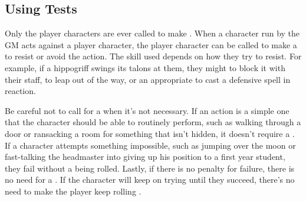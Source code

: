 
\subsection{Using Tests}

Only the player characters are ever called to make {\tests}.
When a character run by the GM acts against a player character, the player character can be called to make a {\test} to resist or avoid the action.
The skill used depends on how they try to resist.
For example, if a hippogriff swings its talons at them, they might {\test}  to block it with their staff, {\test}  to leap out of the way, or {\test} an appropriate {\magicskill} to cast a defensive spell in reaction.

Be careful not to call for a {\test} when it's not necessary.
If an action is a simple one that the character should be able to routinely perform, such as walking through a door or ransacking a room for something that isn't hidden, it doesn't require a {\test}.
If a character attempts something impossible, such as jumping over the moon or fast-talking the headmaster into giving up his position to a first year student, they fail without a {\test} being rolled.
Lastly, if there is no penalty for failure, there is no need for a {\test}.
If the character will keep on trying until they succeed, there's no need to make the player keep rolling {\tests}.

